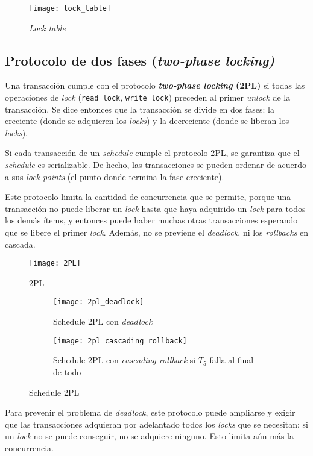 \documentclass[a4paper, twoside]{article}
\begin{document}
\begin{figure}[H]
	\centering
	\texttt{[image: lock\_table]}
	\caption{\emph{Lock table}}
\end{figure}

\subsection{Protocolo de dos fases (\emph{two-phase locking)}}
Una transacción cumple con el protocolo \textbf{\emph{two-phase locking} (2PL)} si todas las operaciones de \emph{lock} (\texttt{read\_lock}, \texttt{write\_lock}) preceden al primer \emph{unlock} de la transacción. Se dice entonces que la transacción se divide en dos fases: la creciente  (donde se adquieren los \emph{locks}) y la decreciente (donde se liberan los \emph{locks}).

Si cada transacción de un \emph{schedule} cumple el protocolo 2PL, se garantiza que el \emph{schedule} es serializable. De hecho, las transacciones se pueden ordenar de acuerdo a sus \emph{lock points} (el punto donde termina la fase creciente).

Este protocolo limita la cantidad de concurrencia que se permite, porque una transacción no puede liberar un \emph{lock} hasta que haya adquirido un \emph{lock} para todos los demás ítems, y entonces puede haber muchas otras transacciones esperando que se libere el primer \emph{lock}. Además, no se previene el \emph{deadlock}, ni los \emph{rollbacks} en cascada.

\begin{figure}[H]
	\centering
	\texttt{[image: 2PL]}
	\caption{2PL}
\end{figure}

\begin{figure}[H]
	\centering
	\begin{subfigure}{0.48\textwidth}
		\centering
		\texttt{[image: 2pl\_deadlock]}
		\caption{Schedule 2PL con \emph{deadlock}}	
	\end{subfigure}
	\begin{subfigure}{0.48\textwidth}
		\centering
		\texttt{[image: 2pl\_cascading\_rollback]}
		\caption{Schedule 2PL con \emph{cascading rollback }si $T_{5}$ falla al final de todo}
	\end{subfigure}
	\caption{Schedule 2PL}
\end{figure}

Para prevenir el problema de \emph{deadlock}, este protocolo puede ampliarse y exigir que las transacciones adquieran por adelantado todos los \emph{locks} que se necesitan; si un \emph{lock} no se puede conseguir, no se adquiere ninguno. Esto limita aún más la concurrencia.
\end{document}
